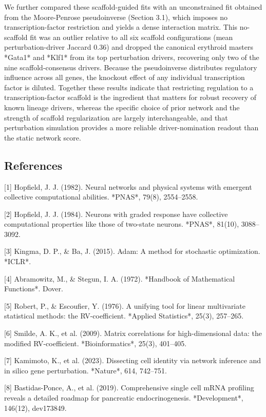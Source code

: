 \documentclass[11pt]{article}
\begin{document}
We further compared these scaffold-guided fits with an unconstrained fit obtained from the Moore-Penrose pseudoinverse (Section 3.1), which imposes no transcription-factor restriction and yields a dense interaction matrix. This no-scaffold fit was an outlier relative to all six scaffold configurations (mean perturbation-driver Jaccard 0.36) and dropped the canonical erythroid masters *Gata1* and *Klf1* from its top perturbation drivers, recovering only two of the nine scaffold-consensus drivers. Because the pseudoinverse distributes regulatory influence across all genes, the knockout effect of any individual transcription factor is diluted. Together these results indicate that restricting regulation to a transcription-factor scaffold is the ingredient that matters for robust recovery of known lineage drivers, whereas the specific choice of prior network and the strength of scaffold regularization are largely interchangeable, and that perturbation simulation provides a more reliable driver-nomination readout than the static network score.



\subsection*{References}

[1] Hopfield, J. J. (1982). Neural networks and physical systems with emergent collective computational abilities. *PNAS*, 79(8), 2554--2558.

[2] Hopfield, J. J. (1984). Neurons with graded response have collective computational properties like those of two-state neurons. *PNAS*, 81(10), 3088--3092.

[3] Kingma, D. P., \& Ba, J. (2015). Adam: A method for stochastic optimization. *ICLR*.

[4] Abramowitz, M., \& Stegun, I. A. (1972). *Handbook of Mathematical Functions*. Dover.

[5] Robert, P., \& Escoufier, Y. (1976). A unifying tool for linear multivariate statistical methods: the RV-coefficient. *Applied Statistics*, 25(3), 257--265.

[6] Smilde, A. K., et al. (2009). Matrix correlations for high-dimensional data: the modified RV-coefficient. *Bioinformatics*, 25(3), 401--405.

[7] Kamimoto, K., et al. (2023). Dissecting cell identity via network inference and in silico gene perturbation. *Nature*, 614, 742--751.

[8] Bastidas-Ponce, A., et al. (2019). Comprehensive single cell mRNA profiling reveals a detailed roadmap for pancreatic endocrinogenesis. *Development*, 146(12), dev173849.
\end{document}
